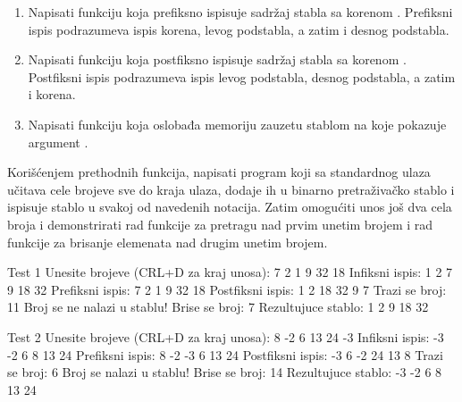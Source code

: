 \begin{Exercise}[label=701]
\begin{enumerate}
\item Napisati funkciju  koja prefiksno ispisuje sadržaj stabla sa korenom . Prefiksni ispis podrazumeva ispis korena, levog podstabla, a zatim i desnog podstabla.

\item Napisati funkciju  koja postfiksno ispisuje sadržaj stabla sa korenom . Postfiksni ispis podrazumeva ispis levog podstabla, desnog podstabla, a zatim i korena.

\item Napisati funkciju  koja oslobađa memoriju zauzetu stablom na koje pokazuje argument .
\end{enumerate}

Korišćenjem prethodnih funkcija, napisati program koji sa standardnog ulaza učitava cele brojeve sve do kraja ulaza, dodaje ih u binarno pretraživačko stablo i ispisuje stablo u svakoj od navedenih notacija. Zatim omogućiti unos još dva cela broja i demonstrirati rad funkcije za pretragu nad prvim unetim brojem i rad funkcije za brisanje elemenata nad drugim unetim brojem. 

\begin{maxitest}
\begin{test}{Test 1}
Unesite brojeve (CRL+D za kraj unosa): 7 2 1 9 32 18
Infiksni ispis: 1 2 7 9 18 32
Prefiksni ispis: 7 2 1 9 32 18
Postfiksni ispis: 1 2 18 32 9 7
Trazi se broj: 11
Broj se ne nalazi u stablu!
Brise se broj: 7
Rezultujuce stablo: 1 2 9 18 32
\end{test}
\end{maxitest}

\begin{maxitest}
\begin{test}{Test 2}
Unesite brojeve (CRL+D za kraj unosa): 8 -2 6 13 24 -3
Infiksni ispis:  -3 -2 6 8 13 24
Prefiksni ispis: 8 -2 -3 6 13 24
Postfiksni ispis: -3 6 -2 24 13 8 
Trazi se broj: 6
Broj se nalazi u stablu!
Brise se broj: 14
Rezultujuce stablo: -3 -2 6 8 13 24
\end{test}
\end{maxitest}


\end{Exercise}

\begin{Answer}[ref=701]
\end{Answer}



